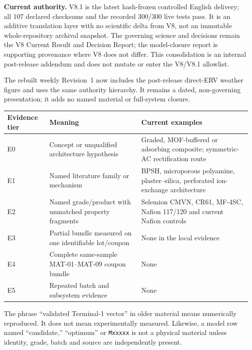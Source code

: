\documentclass[10pt,a4paper]{article}
\begin{document}
\begin{mainbox}
\textbf{Current authority.} V8.1 is the latest hash-frozen controlled English
delivery; all 107 declared checksums and the recorded 300/300 live tests pass.
It is an additive translation layer with no scientific delta from V8, not an
immutable whole-repository archival snapshot. The governing science and decisions
remain the V8 Current Result and Decision Report; the model-closure report is
supporting provenance where V8 does not differ. This consolidation is an
internal post-release addendum and does not mutate or enter the V8/V8.1
allowlist.
\end{mainbox}

The rebuilt weekly Revision~1 now includes the post-release direct-ERV weather
figure and uses the same authority hierarchy. It remains a dated,
non-governing presentation; it adds no named material or full-system closure.

\begin{center}\small
\begin{tabularx}{\textwidth}{@{}p{25mm}Y Y@{}}
\toprule
\textbf{Evidence tier} & \textbf{Meaning} & \textbf{Current examples} \\
\midrule
E0 & Concept or unqualified architecture hypothesis & Graded, MOF-buffered or adsorbing composite; symmetric-AC rectification route \\
E1 & Named literature family or mechanism & BPSH, microporous polyamine, plaster--silica, perforated ion-exchange architecture \\
E2 & Named grade/product with unmatched property fragments & Selemion CMVN, CR61, MF-4SC, Nafion 117/120 and current Nafion controls \\
E3 & Partial bundle measured on one identifiable lot/coupon & None in the local evidence \\
E4 & Complete same-sample MAT-01--MAT-09 coupon bundle & None \\
E5 & Repeated batch and subsystem evidence & None \\
\bottomrule
\end{tabularx}
\end{center}

\begin{warningbox}
The phrase ``validated Terminal-1 vector'' in older material means numerically
reproduced. It does not mean experimentally measured. Likewise, a model row
named ``candidate,'' ``optimum'' or \texttt{Mxxxxx} is not a physical material
unless identity, grade, batch and source are independently present.
\end{warningbox}
\end{document}
